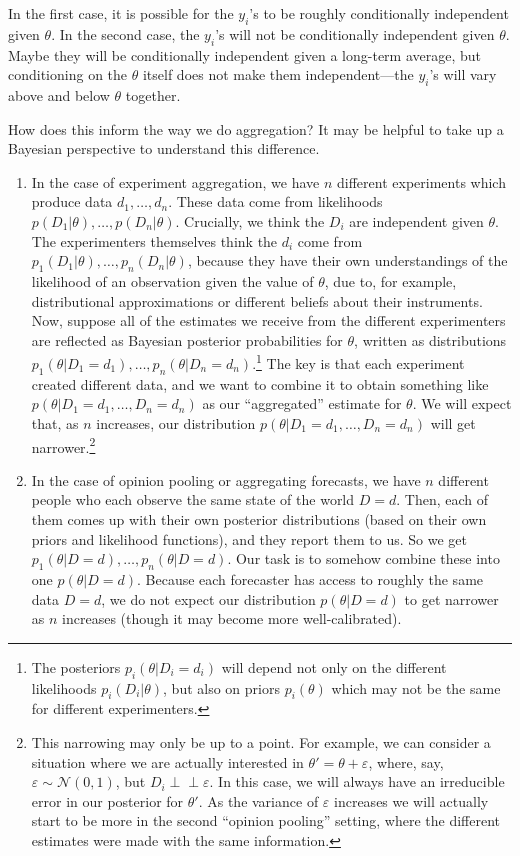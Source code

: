 \documentclass[letterpaper,12pt]{article}
\begin{document}
In the first case, it is possible for the $y_i$'s to be roughly conditionally independent given $\theta$. In the second case, the $y_i$'s will not be conditionally independent given $\theta$. Maybe they will be conditionally independent given a long-term average, but conditioning on the $\theta$ itself does not make them independent---the $y_i$'s will vary above and below $\theta$ together.

How does this inform the way we do aggregation? It may be helpful to take up a Bayesian perspective to understand this difference.

\begin{enumerate}
\item
  In the case of experiment aggregation, we have $n$ different experiments which produce data $d_1,\ldots,d_n$. These data come from likelihoods $p(D_1|\theta),\ldots,p(D_n|\theta)$. Crucially, we think the $D_i$ are independent given $\theta$. The experimenters themselves think the $d_i$ come from $p_1(D_1|\theta),\ldots,p_n(D_n|\theta)$, because they have their own understandings of the likelihood of an observation given the value of $\theta$, due to, for example, distributional approximations or different beliefs about their instruments. Now, suppose all of the estimates we receive from the different experimenters are reflected as Bayesian posterior probabilities for $\theta$, written as distributions $p_1(\theta|D_1=d_1),\ldots,p_n(\theta|D_n=d_n)$.\footnote{The posteriors $p_i(\theta|D_i=d_i)$ will depend not only on the different likelihoods $p_i(D_i|\theta)$, but also on priors $p_i(\theta)$ which may not be the same for different experimenters.} The key is that each experiment created different data, and we want to combine it to obtain something like $p(\theta|D_1=d_1,\ldots,D_n=d_n)$ as our ``aggregated'' estimate for $\theta$. We will expect that, as $n$ increases, our distribution $p(\theta|D_1=d_1,\ldots,D_n=d_n)$ will get narrower.\footnote{This narrowing may only be up to a point. For example, we can consider a situation where we are actually interested in $\theta'=\theta+\varepsilon$, where, say, $\varepsilon\sim\mathcal{N}(0,1)$, but $D_i\perp\!\!\!\!\perp\varepsilon$. In this case, we will always have an irreducible error in our posterior for $\theta'$. As the variance of $\varepsilon$ increases we will actually start to be more in the second ``opinion pooling'' setting, where the different estimates were made with the same information.}
\item
  In the case of opinion pooling or aggregating forecasts, we have $n$ different people who each observe the same state of the world $D=d$. Then, each of them comes up with their own posterior distributions (based on their own priors and likelihood functions), and they report them to us. So we get $p_1(\theta|D=d),\ldots,p_n(\theta|D=d)$. Our task is to somehow combine these into one $p(\theta|D=d)$. Because each forecaster has access to roughly the same data $D=d$, we do not expect our distribution $p(\theta|D=d)$ to get narrower as $n$ increases (though it may become more well-calibrated).
\end{enumerate}
\end{document}
